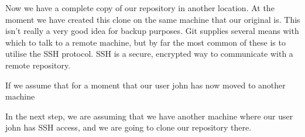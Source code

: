 Now we have a complete copy of our repository in another location.  At the moment we have created this clone on the same machine that our original is.  This isn't really a very good idea for backup purposes.  Git supplies several means with which to talk to a remote machine, but by far the most common of these is to utilise the SSH protocol.  SSH is a secure, encrypted way to communicate with a remote repository.  

If we assume that for a moment that our user john has now moved to another machine

In the next step, we are assuming that we have another machine where our user john has SSH access, and we are going to clone our repository there.







